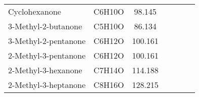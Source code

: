 \begin{landscape}
\begin{longtable}[c]{@{}lcccccc@{}}
Cyclohexanone        & C6H10O           & 98.145              &                              &                               &                          &                  \\
3-Methyl-2-butanone  & C5H10O           & 86.134              &                              &                               &                          &                  \\
3-Methyl-2-pentanone & C6H12O           & 100.161             &                              &                               &                          &                  \\
2-Methyl-3-pentanone & C6H12O           & 100.161             &                              &                               &                          &                  \\
2-Methyl-3-hexanone  & C7H14O           & 114.188             &                              &                               &                          &                  \\
2-Methyl-3-heptanone & C8H16O           & 128.215             &                              &                               &                          &                  \\* \bottomrule
\end{longtable}
\end{landscape}



